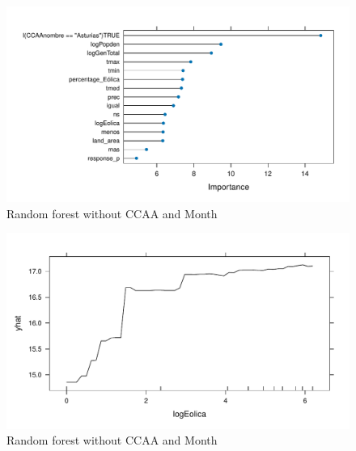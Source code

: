 \documentclass[
]{report}
\begin{document}
\begin{figure}

{\centering \includegraphics{Modelling_Energy_Intensity-V3_files/figure-pdf/unnamed-chunk-6-1.pdf}

}

\caption{Random forest without CCAA and Month}

\end{figure}

\begin{figure}

{\centering \includegraphics{Modelling_Energy_Intensity-V3_files/figure-pdf/unnamed-chunk-6-2.pdf}

}

\caption{Random forest without CCAA and Month}

\end{figure}
\end{document}
